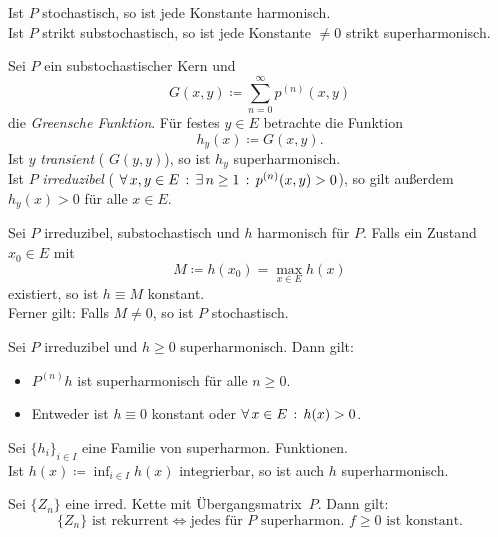 \documentclass{cheat-sheet}
\begin{document}
\begin{bem}
  Ist $P$ stochastisch, so ist jede Konstante harmonisch. \\
  Ist $P$ strikt substochastisch, so ist jede Konstante $\neq 0$ strikt superharmonisch.
\end{bem}

\begin{bsp}
  Sei $P$ ein substochastischer Kern und
  \[ G(x, y) \coloneqq {\sum}_{n=0}^\infty p^{(n)}(x, y) \]
  die \textit{Greensche Funktion}.
  Für festes $y \in E$ betrachte die Funktion
  \[ h_y(x) \coloneqq G(x, y). \]
  Ist $y$ \textit{transient} (\dh{} $G(y, y)$), so ist $h_y$ superharmonisch. \\
  Ist $P$ \textit{irreduzibel} (\dh{} $\forall \, {x, y \in E} \,:\, \exists \, {n \geq 1} \,:\, p^{(n)}(x, y) > 0$), so gilt außerdem $h_y(x) > 0$ für alle $x \in E$.
\end{bsp}

\begin{lem}
  Sei $P$ irreduzibel, substochastisch und $h$ harmonisch für $P$.
  Falls ein Zustand $x_0 \in E$ mit
  \[
    M \coloneqq h(x_0) = \max_{x \in E} h(x)
  \]
  existiert, so ist $h \equiv M$ konstant. \\
  Ferner gilt: Falls $M \neq 0$, so ist $P$ stochastisch.
\end{lem}

\begin{lem}
  Sei $P$ irreduzibel und $h \geq 0$ superharmonisch.
  Dann gilt:
  \begin{itemize}
    \item $P^{(n)} h$ ist superharmonisch für alle $n \geq 0$.
    \item Entweder ist $h \equiv 0$ konstant oder $\forall \, {x \in E} \,:\, h(x) > 0$.
  \end{itemize}
\end{lem}

\begin{lem}
  Sei $\{ h_i \}_{i \in I}$ eine Familie von superharmon. Funktionen. \\
  Ist $h(x) \coloneqq {\inf}_{i \in I} h(x)$ integrierbar, so ist auch $h$ superharmonisch.
\end{lem}

\begin{satz}
  Sei $\{ Z_n \}$ eine irred. Kette mit Übergangsmatrix~$P$.
  Dann gilt:
  \[
    \{ Z_n \} \text{ ist rekurrent} \iff
    \text{jedes für~$P$ superharmon. $f \geq 0$ ist konstant}.
  \]
\end{satz}
\end{document}
